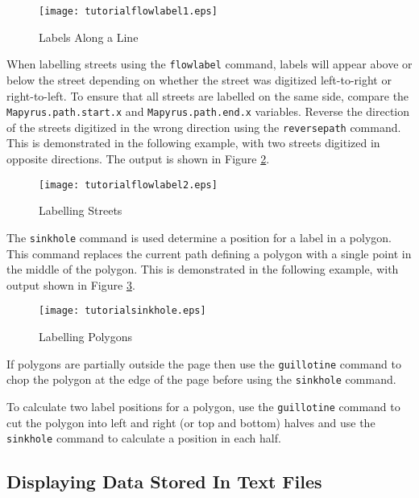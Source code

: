 

\begin{figure}[htb]
\texttt{[image: tutorialflowlabel1.eps]}
\caption{Labels Along a Line}
\label{tutoriallabels4}
\end{figure}

When labelling streets using the \texttt{flowlabel} command,
labels will appear above or below the street depending on whether
the street was digitized left-to-right or right-to-left.
To ensure that all streets are labelled on the same side, compare the
\texttt{Mapyrus.path.start.x} and \texttt{Mapyrus.path.end.x}
variables.
Reverse the direction of the streets digitized in the wrong
direction using the \texttt{reversepath} command.
This is demonstrated in the following example, with two streets
digitized in opposite directions.
The output is shown in Figure \ref{tutoriallabels5}.



\begin{figure}[htb]
\texttt{[image: tutorialflowlabel2.eps]}
\caption{Labelling Streets}
\label{tutoriallabels5}
\end{figure}

The \texttt{sinkhole} command is used determine a position
for a label in a polygon.  This command
replaces the current path defining a polygon with a single point in
the middle of the polygon.  This is demonstrated in the following
example, with output shown in Figure \ref{tutorialsinkhole}.



\begin{figure}[htb]
\texttt{[image: tutorialsinkhole.eps]}
\caption{Labelling Polygons}
\label{tutorialsinkhole}
\end{figure}

If polygons are partially outside the page then
use the \texttt{guillotine} command to chop the
polygon at the edge of the page before using the \texttt{sinkhole}
command.

To calculate two label positions for a polygon, use the \texttt{guillotine}
command to cut the polygon into left and right (or top and bottom)
halves and use the \texttt{sinkhole} command to calculate a
position in each half.

\subsection{Displaying Data Stored In Text Files}

